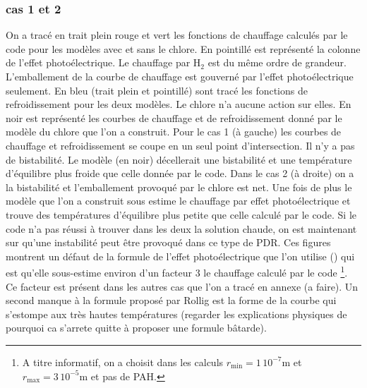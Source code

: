 \subsubsection{cas 1 et 2}
On a tracé en trait plein rouge et vert les fonctions de chauffage calculés par le code pour les modèles avec et sans le chlore. En pointillé est représenté la colonne de l'effet photoélectrique. Le chauffage par $\mathrm{H}_2$ est du même ordre de grandeur. L'emballement de la courbe de chauffage est gouverné par l'effet photoélectrique seulement. En bleu (trait plein et pointillé) sont tracé les fonctions de refroidissement pour les deux modèles. Le chlore n'a aucune action sur elles. En noir est représenté les courbes de chauffage et de refroidissement donné par le modèle du chlore que l'on a construit. \newline 
Pour le cas 1 (à gauche) les courbes de chauffage et refroidissement se coupe en un seul point d'intersection. Il n'y a pas de bistabilité. Le modèle (en noir) décellerait une bistabilité et une température d'équilibre plus froide que celle donnée par le code. Dans le cas 2 (à droite) on a la bistabilité et l'emballement provoqué par le chlore est net. Une fois de plus le modèle que l'on a construit sous estime le chauffage par effet photoélectrique et trouve des températures d'équilibre plus petite que celle calculé par le code. Si le code n'a pas réussi à trouver dans les deux la solution chaude, on est maintenant sur qu'une instabilité peut être provoqué dans ce type de PDR. Ces figures montrent un défaut de la formule de l'effet photoélectrique que l'on utilise (\cite{Rollig2005}) qui est qu'elle sous-estime environ d'un facteur 3 le chauffage calculé par le code \footnote{A titre informatif, on a choisit dans les calculs $r_\mathrm{min} = 1\,10^{-7} \mathrm{m}$ et $r_\mathrm{max} = 3\,10^{-5} \mathrm{m}$ et pas de PAH.}. Ce facteur est présent dans les autres cas que l'on a tracé en annexe (a faire). Un second manque à la formule proposé par Rollig est la forme de la courbe qui s'estompe aux très hautes températures (regarder les explications physiques de pourquoi ca s'arrete quitte à proposer une formule bâtarde). 

